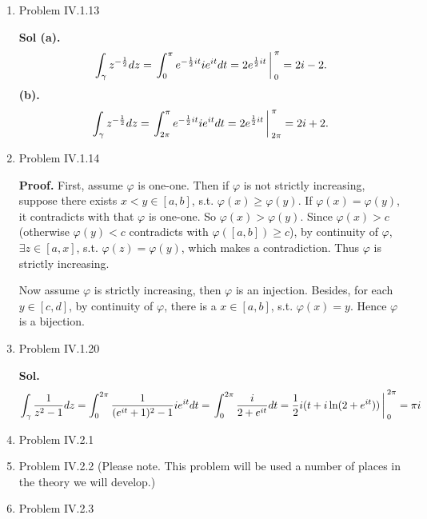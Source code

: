 \documentclass{article}%
\begin{document}
\begin{enumerate}
\item Problem IV.1.13

\textbf{Sol (a).} 
$$
\int_{\gamma}z^{-\frac{1}{2}}dz = \left.\int_{0}^{\pi}e^{-\frac{1}{2}it}ie^{it}dt = 2e^{\frac{1}{2}it}\right\arrowvert_{0}^{\pi} = 2i-2.
$$
\textbf{(b).}
$$
\int_{\gamma}z^{-\frac{1}{2}}dz = \left.\int_{2\pi}^{\pi}e^{-\frac{1}{2}it}ie^{it}dt = 2e^{\frac{1}{2}it}\right\arrowvert_{2\pi}^{\pi} = 2i+2.
$$

\item Problem IV.1.14

\textbf{Proof.} First, assume $\varphi$ is one-one. Then if $\varphi$ is not strictly increasing, suppose there exists $x < y \in [a, b]$, s.t. $\varphi(x) \ge \varphi(y)$. If $\varphi(x) = \varphi(y)$, it contradicts with that $\varphi$ is one-one. So $\varphi(x) > \varphi(y)$. Since $\varphi(x) > c$ (otherwise $\varphi(y) < c$ contradicts with $\varphi([a, b]) \ge c$), by continuity of $\varphi$, $\exists z \in [a, x]$, s.t. $\varphi(z) = \varphi(y)$, which makes a contradiction. Thus $\varphi$ is strictly increasing.

Now assume $\varphi$ is strictly increasing, then $\varphi$ is an injection. Besides, for each $y\in [c, d]$, by continuity of $\varphi$, there is a $x\in[a, b]$, s.t. $\varphi(x) = y$. Hence $\varphi$ is a bijection.

\item Problem IV.1.20

\textbf{Sol.} 
$$
\int_{\gamma}\frac{1}{z^2-1}dz = \int_{0}^{2\pi}\frac{1}{(e^{it}+1)^2-1}ie^{it}dt = \left.\int_{0}^{2\pi}\frac{i}{2+e^{it}}dt = \frac{1}{2}i(t+i\ln(2+e^{it}))\right\arrowvert_{0}^{2\pi} = \pi i
$$

\item Problem IV.2.1

\item Problem IV.2.2  (Please note.  This problem will be used a number of places in the theory we will develop.)

\item Problem IV.2.3

\end{enumerate}
\end{document}
